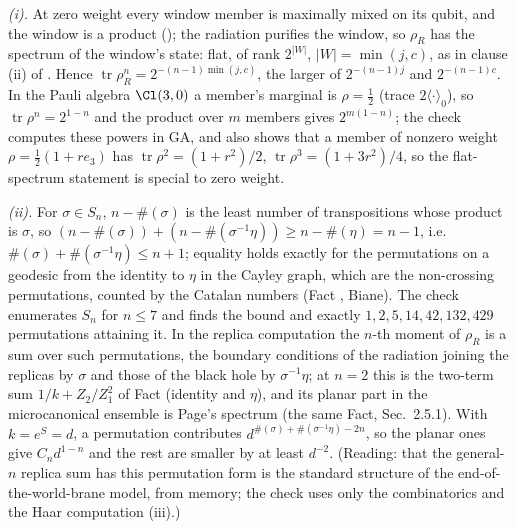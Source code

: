 \emph{(i).} At zero weight every window member is maximally mixed on its qubit, and the window is a product (); the radiation purifies the window, so $\rho_{R}$ has the spectrum of the window's state: flat, of rank $2^{|W|}$, $|W| = \min(j, c)$, as in clause (ii) of . Hence $\operatorname{tr}\rho_{R}^{n} = 2^{-(n-1)\min(j,c)}$, the larger of $2^{-(n-1)j}$ and $2^{-(n-1)c}$. In the Pauli algebra $\Cl(3,0)$ a member's marginal is $\rho = \tfrac12$ (trace $2\langle\cdot\rangle_{0}$), so $\operatorname{tr}\rho^{n} = 2^{1-n}$ and the product over $m$ members gives $2^{m(1-n)}$; the check computes these powers in GA, and also shows that a member of nonzero weight $\rho = \tfrac12(1 + r e_{3})$ has $\operatorname{tr}\rho^{2} = (1+r^{2})/2$, $\operatorname{tr}\rho^{3} = (1 + 3r^{2})/4$, so the flat-spectrum statement is special to zero weight.

\emph{(ii).} For $\sigma \in S_{n}$, $n - \#(\sigma)$ is the least number of transpositions whose product is $\sigma$, so $(n - \#(\sigma)) + (n - \#(\sigma^{-1}\eta)) \geq n - \#(\eta) = n - 1$, i.e.\ $\#(\sigma) + \#(\sigma^{-1}\eta) \leq n + 1$; equality holds exactly for the permutations on a geodesic from the identity to $\eta$ in the Cayley graph, which are the non-crossing permutations, counted by the Catalan numbers (Fact , Biane). The check enumerates $S_{n}$ for $n \leq 7$ and finds the bound and exactly $1, 2, 5, 14, 42, 132, 429$ permutations attaining it. In the replica computation the $n$-th moment of $\rho_{R}$ is a sum over such permutations, the boundary conditions of the radiation joining the replicas by $\sigma$ and those of the black hole by $\sigma^{-1}\eta$; at $n = 2$ this is the two-term sum $1/k + Z_{2}/Z_{1}^{2}$ of Fact  (identity and $\eta$), and its planar part in the microcanonical ensemble is Page's spectrum (the same Fact, Sec.\ 2.5.1). With $k = e^{S} = d$, a permutation contributes $d^{\#(\sigma) + \#(\sigma^{-1}\eta) - 2n}$, so the planar ones give $C_{n}d^{1-n}$ and the rest are smaller by at least $d^{-2}$. (Reading: that the general-$n$ replica sum has this permutation form is the standard structure of the end-of-the-world-brane model, from memory; the check uses only the combinatorics and the Haar computation (iii).)

